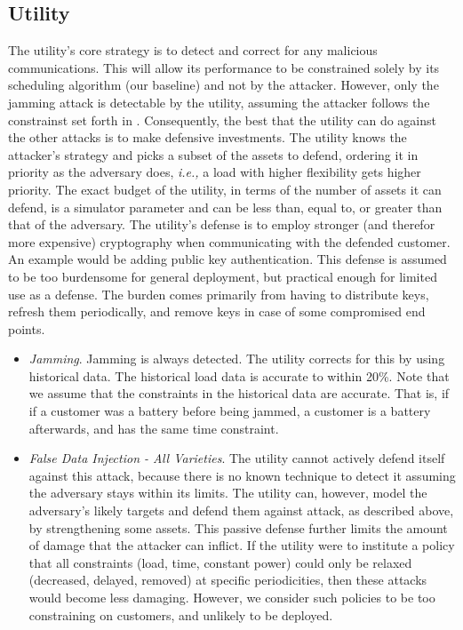 \documentclass[conference]{IEEEtran}
\newcommand{\ie}{\emph{i.e.,}\xspace}
\begin{document}
\subsection{Utility}
\label{Utility2}

The utility's core strategy is to detect and correct for any malicious communications. This will allow its performance to be
constrained solely by its scheduling algorithm (our baseline) and not by the attacker. However, only the jamming attack is detectable by the utility, assuming the attacker follows the constrainst set forth in \cite{yuan2011modeling}. Consequently, the best that the utility can do against the other attacks is to make defensive investments. The utility knows the attacker's strategy and picks a subset of the assets to defend, ordering it in priority as the adversary does, \ie a load with higher flexibility gets higher priority. The exact budget of the utility, in terms of the number of assets it can defend, is a simulator parameter and can be less than, equal to, or greater than that of the adversary. The utility's defense is to employ stronger (and therefor more expensive) cryptography when communicating with the defended customer.  An example would be adding public key authentication. This defense is assumed to be too burdensome for general deployment, but practical enough for limited use as a defense. The burden comes primarily from having to distribute keys, refresh them periodically, and remove keys in case of some compromised end points.  

\begin{itemize}
\item {\em Jamming}. Jamming is always detected. The utility corrects for this by using historical data. The historical load data is accurate to within 20\%.  
Note that we assume that the constraints in the historical data are accurate. That is, if if a customer was a battery before being jammed, a customer is a battery afterwards, and has the same time constraint.

\item {\em False Data Injection - All Varieties}. The utility cannot actively defend itself against this attack, because there is no known technique to detect it assuming the adversary stays within its limits. The utility can, however, model the adversary's likely targets and defend them against attack, as described above, by strengthening some assets. This passive defense further limits the amount of damage that the attacker can inflict. If the utility were to institute a policy that all constraints (load, time, constant power) could only be relaxed (decreased, delayed, removed) at specific periodicities, then these attacks would become less damaging. However, we consider such policies to be too constraining on customers, and unlikely to be deployed.

\end{itemize}
\end{document}
